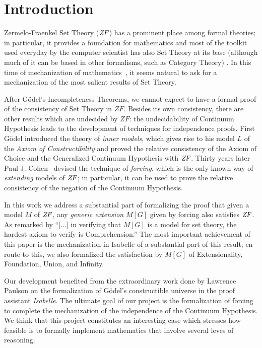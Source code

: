 \section{Introduction}
Zermelo-Fraenkel Set Theory ($\mathit{ZF}$) has a prominent place among formal
theories; in particular, it provides a foundation for mathematics and
most of the toolkit used everyday by the computer scientist has also
Set Theory at its base (although much of it can be based in other
formalisms, such as Category Theory) . In this time of mechanization of
mathematics~\cite{avigad2018mechanization}, it seems natural to ask
for a mechanization of the most salient results of Set Theory.

After G\"odel's Incompleteness Theorems, we cannot expect to have a
formal proof of the consistency of Set Theory in $ZF$. Besides its own
consistency, there are other results which are undecided by $ZF$: the
undecidability of Continuum Hypothesis leads to the development of
techniques for independence proofs. First G\"odel introduced the
theory of \emph{inner models}, which gives rise to his model $L$ of
the \emph{Axiom of Constructibility} \cite{godel-L} and proved the
relative consistency of the Axiom of Choice and the Generalized
Continuum Hypothesis with $\mathit{ZF}$. Thirty years later Paul
J. Cohen~\cite{Cohen-CH-PNAS} devised the technique of \emph{forcing},
which is the only known way of \emph{extending} models of $\mathit{ZF}$; in
particular, it can be used to prove the relative consistency of the
negation of the Continuum Hypothesis. 

In this work we address a substantial part of formalizing the proof
that given a model $M$ of $\mathit{ZF}$, any \emph{generic extension} $M[G]$
given by forcing also satisfies $\mathit{ZF}$. As remarked by
\citet[][p.250]{kunen2011set} \enquote{[...] in verifying that $M[G]$
  is a model for set theory, the hardest axiom to verify is
  Comprehension.}  The most important achievement of this paper is the
mechanization in Isabelle of a substantial part of this result; en
route to this, we also formalized the satisfaction by $M[G]$ of
Extensionality, Foundation, Union, and Infinity. 

Our development benefited from the extraordinary work done by Lawrence
Paulson \cite{paulson_2003} on the formalization of G\"odel's
constructible universe in the proof assistant \emph{Isabelle}. The
ultimate goal of our project is the formalization of forcing to
complete the mechanization of the independence of the Continuum
Hypothesis. We think that this project constitutes an interesting case
which stresses how feasible is to formally implement mathematics that
involve several leves of reasoning.

